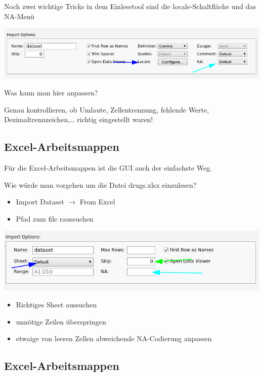 \documentclass[
]{book}
\providecommand{\tightlist}{%
  \setlength{\itemsep}{0pt}\setlength{\parskip}{0pt}}
\begin{document}
Noch zwei wichtige Tricks in dem Einlesetool sind die locale-Schaltfläche und das NA-Menü

\begin{center}\includegraphics[width=0.8\linewidth]{imgs/text4} \end{center}

Was kann man hier anpassen?

Genau kontrollieren, ob Umlaute, Zellentrennung, fehlende Werte, Dezimaltrennzeichen,\ldots{} richtig eingestellt waren!

\hypertarget{excel-arbeitsmappen}{%
\subsection{Excel-Arbeitsmappen}\label{excel-arbeitsmappen}}

Für die Excel-Arbeitsmappen ist die GUI auch der einfachste Weg.

Wie würde man vorgehen um die Datei drugs.xlsx einzulesen?

\begin{itemize}
\tightlist
\item
  Import Dataset \(\rightarrow\) From Excel
\item
  Pfad zum file raussuchen
\end{itemize}

\begin{center}\includegraphics[width=0.8\linewidth]{imgs/excel1} \end{center}

\begin{itemize}
\tightlist
\item
  Richtiges Sheet aussuchen
\item
  unnötige Zeilen überspringen
\item
  etwaige von leeren Zellen abweichende NA-Codierung anpassen
\end{itemize}

\hypertarget{excel-arbeitsmappen-1}{%
\subsection{Excel-Arbeitsmappen}\label{excel-arbeitsmappen-1}}
\end{document}
